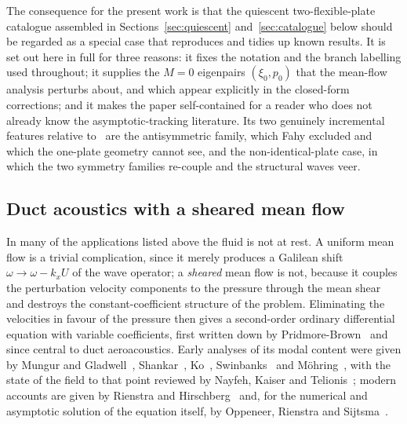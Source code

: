 \documentclass[11pt,a4paper]{article}
\theoremstyle{plain}
\theoremstyle{remark}
\begin{document}
The consequence for the present work is that the quiescent two-flexible-plate catalogue assembled in
Sections~\ref{sec:quiescent} and~\ref{sec:catalogue} below should be regarded as a special case that
reproduces and tidies up known results. It is set out here in full for three reasons: it fixes the
notation and the branch labelling used throughout; it supplies the $M=0$ eigenpairs $(\xi_0,p_0)$ that
the mean-flow analysis perturbs about, and which appear explicitly in the closed-form corrections; and
it makes the paper self-contained for a reader who does not already know the asymptotic-tracking
literature. Its two genuinely incremental features relative to~\cite{fahy,sarkarsonti} are the
antisymmetric family, which Fahy excluded and which the one-plate geometry cannot see, and the
non-identical-plate case, in which the two symmetry families re-couple and the structural waves veer.

\subsection{Duct acoustics with a sheared mean flow}
In many of the applications listed above the fluid is not at rest. A uniform mean flow is a trivial
complication, since it merely produces a Galilean shift $\omega\to\omega-k_xU$ of the wave operator; a
\emph{sheared} mean flow is not, because it couples the perturbation velocity components to the
pressure through the mean shear and destroys the constant-coefficient structure of the problem.
Eliminating the velocities in favour of the pressure then gives a second-order ordinary differential
equation with variable coefficients, first written down by Pridmore-Brown~\cite{pridmorebrown} and
since central to duct aeroacoustics. Early analyses of its modal content were given by Mungur and
Gladwell~\cite{mungurgladwell}, Shankar~\cite{shankar}, Ko~\cite{ko}, Swinbanks~\cite{swinbanks} and
M\"ohring~\cite{mohring}, with the state of the field to that point reviewed by Nayfeh, Kaiser and
Telionis~\cite{nayfeh}; modern accounts are given by Rienstra and Hirschberg~\cite{rienstrahirschberg}
and, for the numerical and asymptotic solution of the equation itself, by Oppeneer, Rienstra and
Sijtsma~\cite{oppeneer2016,oppeneer2020}.
\end{document}
